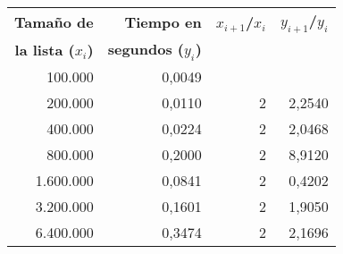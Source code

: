 \centering%
\begin{center}
\begin{tabular}{||r|r|r|r||}
\hline \hline
{\bf Tamaño de } & {\bf Tiempo en } & {\bf $x_{i+1}$/$x_i$} & {\bf $y_{i+1}$/$y_i$} \\
{\bf la lista ($x_i$)} & {\bf segundos ($y_i$)} &  &  \\
\hline \hline
   100.000 &     0,0049 &            &            \\
\hline
   200.000 &     0,0110 &          2 &     2,2540 \\
\hline
   400.000 &     0,0224 &          2 &     2,0468 \\
\hline
   800.000 &     0,2000 &          2 &     8,9120 \\
\hline
 1.600.000 &     0,0841 &          2 &     0,4202 \\
\hline
 3.200.000 &     0,1601 &          2 &     1,9050 \\
\hline
 6.400.000 &     0,3474 &          2 &     2,1696 \\
\hline
\hline
\end{tabular}
%
\end{center}
